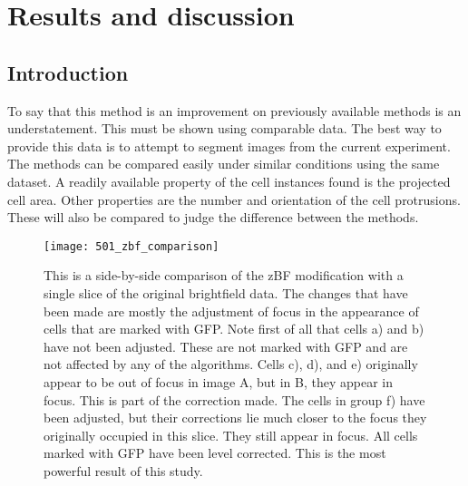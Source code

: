 
\chapter{Results and discussion}

\ifpdf
    \graphicspath{{Chapter5/Figs/Raster/}{Chapter5/Figs/PDF/}{Chapter5/Figs/}}
\else
    \graphicspath{{Chapter5/Figs/Vector/}{Chapter5/Figs/}}
\fi

\section{Introduction}

To say that this method is an improvement on previously available methods is an understatement. This must be shown using comparable data. The best way to provide this data is to attempt to segment images from the current experiment. The methods can be compared easily under similar conditions using the same dataset. A readily available property of the cell instances found is the projected cell area. Other properties are the number and orientation of the cell protrusions. These will also be compared to judge the difference between the methods.

\begin{figure}[h!]
 \centering
 \texttt{[image: 501\_zbf\_comparison]}
 \caption[zBF comparison with brightfield]{
 	This is a side-by-side comparison of the zBF modification with a single slice of the original brightfield data. The changes that have been made are mostly the adjustment of focus in the appearance of cells that are marked with GFP. Note first of all that cells a) and b) have not been adjusted. These are not marked with GFP and are not affected by any of the algorithms. Cells c), d), and e) originally appear to be out of focus in image A, but in B, they appear in focus. This is part of the correction made. The cells in group f) have been adjusted, but their corrections lie much closer to the focus they originally occupied in this slice. They still appear in focus. All cells marked with GFP have been level corrected. This is the most powerful result of this study.
 }
 \label{fig:zbfcomparison}
\end{figure}

